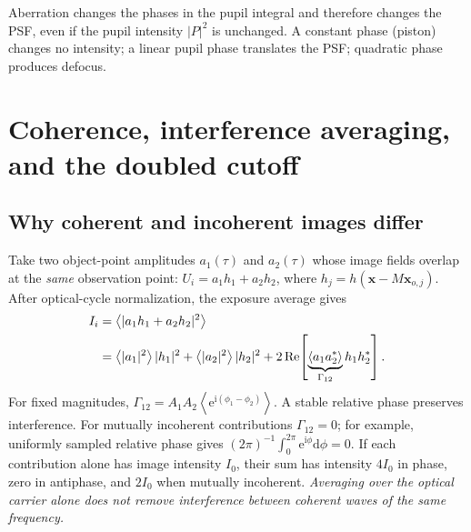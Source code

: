 \documentclass[11pt,a4paper]{article}
\numberwithin{equation}{section}
\newcommand{\dd}{\mathrm{d}}
\newcommand{\ii}{\mathrm{i}}
\newcommand{\ee}{\mathrm{e}}
\newcommand{\vct}[1]{\bm{#1}}
\newcommand{\avg}[1]{\left\langle #1\right\rangle}
\newcommand{\Real}{\operatorname{Re}}
\begin{document}
Aberration changes the phases in the pupil integral and therefore changes
the PSF, even if the pupil intensity $|P|^2$ is unchanged. A constant
phase (piston) changes no intensity; a linear pupil phase translates the
PSF; quadratic phase produces defocus. 
\FloatBarrier

\section{Coherence, interference averaging, and the doubled cutoff}
\subsection{Why coherent and incoherent images differ}
Take two object-point amplitudes $a_1(\tau)$ and $a_2(\tau)$ whose image
fields overlap at the \emph{same} observation point:
$U_i=a_1h_1+a_2h_2$, where $h_j=h(\vct x-M\vct x_{o,j})$.
After optical-cycle normalization, the exposure average gives
\begin{align}
I_i&=\avg{|a_1h_1+a_2h_2|^2}\notag\\
&=\avg{|a_1|^2}|h_1|^2+\avg{|a_2|^2}|h_2|^2
+2\Real\!\left[\underbrace{\avg{a_1a_2^*}}_{\Gamma_{12}}h_1h_2^*\right].
\label{eq:cross-term}
\end{align}
For fixed magnitudes, $\Gamma_{12}=A_1A_2\avg{\ee^{\ii(\phi_1-\phi_2)}}$.
A stable relative phase preserves interference. For mutually incoherent
contributions $\Gamma_{12}=0$; for example, uniformly sampled relative
phase gives $(2\pi)^{-1}\int_0^{2\pi}\ee^{\ii\phi}\dd\phi=0$.
If each contribution alone has image intensity $I_0$, their sum has
intensity $4I_0$ in phase, zero in antiphase, and $2I_0$ when mutually
incoherent. \emph{Averaging over the optical carrier alone does not remove
interference between coherent waves of the same frequency.}
\end{document}
